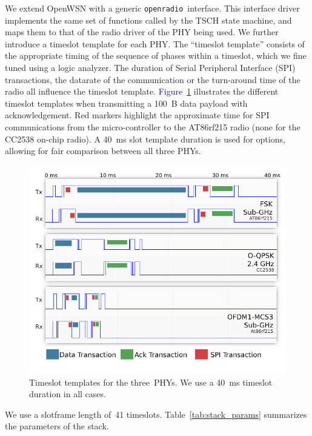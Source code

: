 \documentclass[sensors,article,submit,moreauthors,pdftex]{Definitions/mdpi}
\newcommand{\openradio}     {\texttt{openradio}}
\newcommand{\figwidth}      {0.78}
\newcommand{\update}[1]     {\textcolor{blue}{#1}}
\begin{document}

We extend OpenWSN with a generic \openradio\ interface.
This interface driver implements the same set of functions called by the TSCH state machine, and maps them to that of the radio driver of the PHY being used.
We further introduce a timeslot template for each PHY.
The ``timeslot template'' consists of the appropriate timing of the sequence of phases within a timeslot, which we fine tuned using a logic analyzer.
The duration of Serial Peripheral Interface (SPI) transactions, the datarate of the communication or the turn-around time of the radio all influence the timeslot template.
\update{Figure}~\ref{fig:timeslot_templates} illustrates the different timeslot templates when transmitting a 100~B data payload with acknowledgement.
Red markers highlight the approximate time for SPI communications from the micro-controller to the AT86rf215 radio (none for the CC2538 on-chip radio).
A 40~ms slot template duration is used for options, allowing for fair comparison between all three PHYs.

\begin{figure}
	\centering
	\includegraphics[width=\figwidth\columnwidth]{timeslot_templates}
	\caption{
	    Timeslot templates for the three~PHYs.
	    We use a 40~ms timeslot duration in all cases.
	}
    \label{fig:timeslot_templates}
\end{figure}


We use a slotframe length of~41 timeslots.
Table~\ref{tab:stack_params} summarizes the parameters of the stack.
\end{document}
